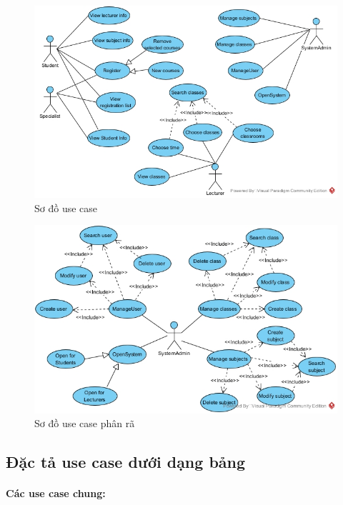 \documentclass{article}
\begin{document}
  \begin{figure}[!ht]
    \centering
    \includegraphics[scale=0.4]{../pictures/projectdiagrams/uc.jpg}
    \caption{Sơ đồ use case}
  \end{figure}

  \begin{figure}[!ht]
    \centering
    \includegraphics[scale=0.4]{../pictures/projectdiagrams/uc-destructing.jpg}
    \caption{Sơ đồ use case phân rã}
  \end{figure}

  \subsection{Đặc tả use case dưới dạng bảng}

  \paragraph{Các use case chung:}
\end{document}
